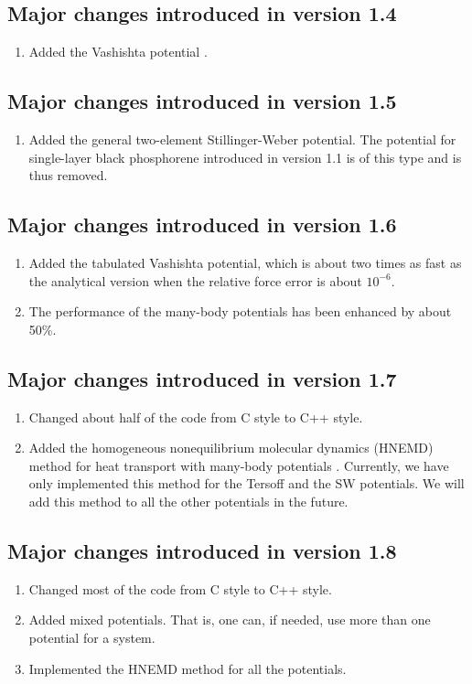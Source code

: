 \documentclass[12pt,a4paper]{report}
\begin{document}
\subsection{Major changes introduced in version 1.4}
\begin{enumerate}
\item Added the Vashishta potential \cite{vashishta2007jap}.
\end{enumerate}


\subsection{Major changes introduced in version 1.5}
\begin{enumerate}
\item Added the general two-element Stillinger-Weber potential. The potential for single-layer black phosphorene introduced in version 1.1 is of this type and is thus removed.
\end{enumerate}

\subsection{Major changes introduced in version 1.6}
\begin{enumerate}
\item Added the tabulated Vashishta potential, which is about two times as fast as the analytical version when the relative force error is about $10^{-6}$.
\item The performance of the many-body potentials has been enhanced by about 50\%.
\end{enumerate}


\subsection{Major changes introduced in version 1.7}
\begin{enumerate}
\item Changed about half of the code from C style to C++ style.
\item Added the homogeneous nonequilibrium molecular dynamics (HNEMD) method for heat transport with many-body potentials \cite{fan2018submitted,xu2018msmse,dong2018pccp}. Currently, we have only implemented this method for the Tersoff and the SW potentials. We will add this method to all the other potentials in the future. 
\end{enumerate}

\subsection{Major changes introduced in version 1.8}
\begin{enumerate}
\item Changed most of the code from C style to C++ style.
\item Added mixed potentials. That is, one can, if needed, use more than one potential for a system.
\item Implemented the HNEMD method \cite{fan2018submitted,xu2018msmse,xu2018submitted,dong2018pccp} for all the potentials.
\end{enumerate}
\end{document}
